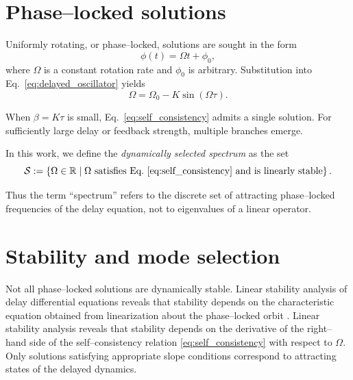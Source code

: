 \documentclass[11pt]{article}
\begin{document}
    \section{Phase--locked solutions}

        Uniformly rotating, or phase--locked, solutions are sought in the form
        \begin{equation}
            \phi(t) = \Omega t + \phi_0,
            \label{eq:ansatz}
        \end{equation}
        where $\Omega$ is a constant rotation rate and $\phi_0$ is arbitrary.
        Substitution into Eq.~\ref{eq:delayed_oscillator} yields
        \begin{equation}
            \Omega = \Omega_0 - K \sin(\Omega\tau).
            \label{eq:self_consistency}
        \end{equation}

        When $\beta=K\tau$ is small, Eq.~\ref{eq:self_consistency} admits a single solution.
        For sufficiently large delay or feedback strength, multiple branches emerge.

        In this work, we define the \emph{dynamically selected spectrum} as the set
        \begin{equation}
            \mathcal{S} :=
            \left\{
            \Omega \in \mathbb{R} \;\middle|\;
            \Omega \text{ satisfies Eq.~\ref{eq:self_consistency} and is linearly stable}
            \right\}.
            \label{eq:frequency_set}
        \end{equation}

        Thus the term ``spectrum'' refers to the discrete set of attracting phase--locked frequencies of the delay equation, not to eigenvalues of a linear operator.

    \section{Stability and mode selection}
        Not all phase--locked solutions are dynamically stable. Linear stability analysis of delay differential equations reveals that stability depends on the characteristic equation obtained from linearization about the phase--locked orbit \cite{Hale1993,Diekmann1995,Erneux2009}. Linear stability analysis reveals that stability depends on the derivative of the right--hand side of the self--consistency relation \ref{eq:self_consistency} with respect to $\Omega$. Only solutions satisfying appropriate slope conditions correspond to attracting states of the delayed dynamics.
\end{document}
